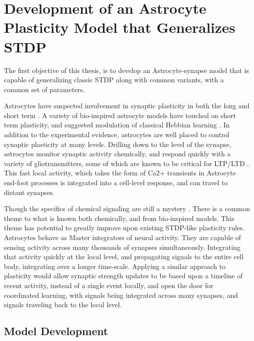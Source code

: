 %

\chapter{Development of an Astrocyte Plasticity Model that Generalizes STDP} \label{chapter:astro_plasticity_modeal}
    The first objective of this thesis, is to develop an Astrocyte-synapse model
    that is capable of generalizing classic STDP along with common
    variants, with a common set of parameters.

    Astrocytes have suspected involvement in synaptic plasticity in both the
    long \cite{min_2012} and short term \cite{pitta_2012}. A variety of
    bio-inspired astrocyte models have touched on short term plasticity, and
    suggested modulation of classical Hebbian learning \cite{pitta_2016}. In
    addition to the experimental evidence, astrocytes are well placed to control
    synaptic plasticity at many levels. Drilling down to the level of the
    synapse, astrocytes monitor synaptic activity chemically, and respond
    quickly with a variety of gliotransmitters, some of which are known to be
    critical for LTP/LTD \cite{min_2012}. This fast local activity, which takes
    the form of Ca2+ transients in Astrocyte end-foot processes is integrated
    into a cell-level response, and can travel to distant synapses.

    Though the specifics of chemical signaling are still a mystery
    \cite{manninen_2018}. There is a common theme to what is known both
    chemically, and from bio-inspired models. This theme has potential to
    greatly improve upon existing STDP-like plasticity rules. Astrocytes behave
    as Master integrators of neural activity. They are capable of sensing
    activity across many thousands of synapses simultaneously. Integrating that
    activity quickly at the local level, and propagating signals to the entire
    cell body, integrating over a longer time-scale. Applying a similar approach
    to plasticity would allow synaptic strength updates to be based upon a
    timeline of recent activity, instead of a single event locally, and open the
    door for coordinated learning, with signals being integrated across many
    synapses, and signals traveling back to the local level.

    \section{Model Development}
    
